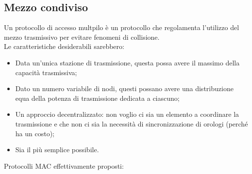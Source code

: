 \subsection{Mezzo condiviso}
Un protocollo di accesso multpilo è un protocollo che regolamenta l'utilizzo del mezzo trasmissivo per evitare fenomeni di collisione. \\
Le caratteristiche desiderabili sarebbero:
\begin{itemize}
	\item Data un'unica stazione di trasmissione, questa possa avere il massimo della capacità trasmissiva;
	\item Dato un numero variabile di nodi, questi possano avere una distribuzione equa della potenza di trasmissione dedicata a ciascuno;
	\item Un approccio decentralizzato: non voglio ci sia un elemento a coordinare la trasmissione e che non ci sia la necessità di sincronizzazione di orologi (perché ha un costo);
	\item Sia il più semplice possibile.
\end{itemize}
Protocolli MAC effettivamente proposti:
